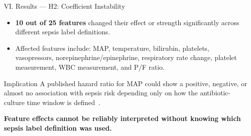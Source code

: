 \begin{frame}{VI. Results --- H2: Coefficient Instability \confirmed}
\begin{itemize}
  \item \textbf{10 out of 25 features} changed their effect or strength
        significantly across different sepsis label definitions.
  \item Affected features include: MAP, temperature, bilirubin, platelets,
        vasopressors, norepinephrine/epinephrine, respiratory rate change,
        platelet measurement, WBC measurement, and P/F ratio.
\end{itemize}

\vspace{6pt}
\begin{block}{Implication}
  A published hazard ratio for MAP could show a positive, negative, or
  almost no association with sepsis risk depending only on how the
  antibiotic-culture time window is defined~\cite{lauritsen2021framing}.
\end{block}

\vspace{6pt}
\textbf{Feature effects cannot be reliably interpreted without knowing which
sepsis label definition was used.}
\end{frame}


